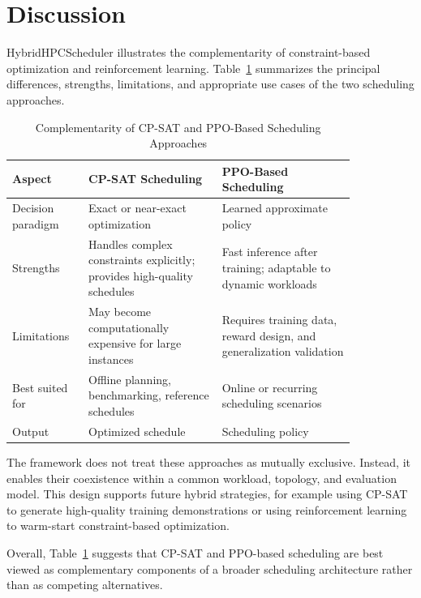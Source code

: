\documentclass[conference]{IEEEtran}
\begin{document}
\section{Discussion}
HybridHPCScheduler illustrates the complementarity of constraint-based
optimization and reinforcement learning. Table~\ref{tab:comparison} summarizes
the principal differences, strengths, limitations, and appropriate use cases of
the two scheduling approaches.

\begin{table}[!t]
\caption{Complementarity of CP-SAT and PPO-Based Scheduling Approaches}
\label{tab:comparison}
\centering
\begin{tabular}{p{0.16\linewidth}p{0.34\linewidth}p{0.34\linewidth}}
\toprule
\textbf{Aspect} & \textbf{CP-SAT Scheduling} & \textbf{PPO-Based Scheduling} \\
\midrule
Decision paradigm & Exact or near-exact optimization & Learned approximate policy \\
\addlinespace
Strengths & Handles complex constraints explicitly; provides high-quality schedules & Fast inference after training; adaptable to dynamic workloads \\
\addlinespace
Limitations & May become computationally expensive for large instances & Requires training data, reward design, and generalization validation \\
\addlinespace
Best suited for & Offline planning, benchmarking, reference schedules & Online or recurring scheduling scenarios \\
\addlinespace
Output & Optimized schedule & Scheduling policy \\
\bottomrule
\end{tabular}
\end{table}

The framework does not treat these approaches as mutually exclusive. Instead, it
enables their coexistence within a common workload, topology, and evaluation
model. This design supports future hybrid strategies, for example using CP-SAT
to generate high-quality training demonstrations or using reinforcement
learning to warm-start constraint-based optimization.

Overall, Table~\ref{tab:comparison} suggests that CP-SAT and PPO-based
scheduling are best viewed as complementary components of a broader scheduling
architecture rather than as competing alternatives.
\end{document}
